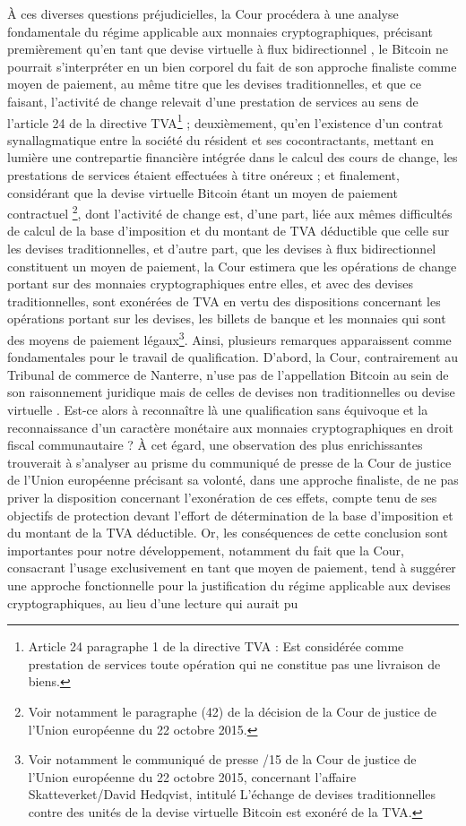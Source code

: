 {À ces diverses questions préjudicielles, la Cour procédera à une analyse fondamentale du régime applicable aux monnaies cryptographiques, précisant premièrement qu'en tant que \og devise virtuelle à flux bidirectionnel \fg{}, le Bitcoin ne pourrait s'interpréter en un bien corporel du fait de son approche finaliste comme moyen de paiement, au même titre que les devises traditionnelles, et que ce faisant, l'activité de change relevait d'une prestation de services au sens de l'article 24 de la directive TVA\footnote{Article 24 paragraphe 1 de la directive TVA : \og Est considérée comme \og prestation de services \fg{} toute opération qui ne constitue pas une livraison de biens\fg{}.} ; deuxièmement, qu'en l'existence d'un contrat synallagmatique entre la société du résident et ses cocontractants, mettant en lumière une contrepartie financière intégrée dans le calcul des cours de change, les prestations de services étaient effectuées à titre onéreux ; et finalement, considérant que \og la devise virtuelle Bitcoin étant un moyen de paiement contractuel \fg\footnote{Voir notamment le paragraphe (42) de la décision de la Cour de justice de l'Union européenne du 22 octobre 2015.}, dont l'activité de change est, d'une part, liée aux mêmes difficultés de calcul de la base d'imposition et du montant de TVA déductible que celle sur les devises traditionnelles, et d'autre part, que les devises à flux bidirectionnel constituent un moyen de paiement, la Cour estimera que les opérations de change portant sur des monnaies cryptographiques entre elles, et avec des devises traditionnelles, sont exonérées de TVA en vertu des dispositions concernant les opérations portant sur \og les devises, les billets de banque et les monnaies qui sont des moyens de paiement légaux\fg\footnote{Voir notamment le communiqué de presse /15 de la Cour de justice de l'Union européenne du 22 octobre 2015, concernant l'affaire Skatteverket/David Hedqvist, intitulé \og L'échange de devises traditionnelles contre des unités de la devise virtuelle Bitcoin est exonéré de la TVA\fg.}. Ainsi, plusieurs remarques apparaissent comme fondamentales pour le travail de qualification. D'abord, la Cour, contrairement au Tribunal de commerce de Nanterre, n'use pas de l'appellation \og Bitcoin \fg{} au sein de son raisonnement juridique mais de celles de \og devises non traditionnelles \fg{} ou \og devise virtuelle \fg{}. Est-ce alors à reconnaître là une qualification sans équivoque et la reconnaissance d'un caractère monétaire aux monnaies cryptographiques en droit fiscal communautaire ? À cet égard, une observation des plus enrichissantes trouverait à s'analyser au prisme du communiqué de presse de la Cour de justice de l'Union européenne précisant sa volonté, dans une approche finaliste, de ne pas priver la disposition concernant l'exonération de ces effets, compte tenu de ses objectifs de protection devant l'effort de détermination de la base d'imposition et du montant de la TVA déductible. Or, les conséquences de cette conclusion sont importantes pour notre développement, notamment du fait que la Cour, consacrant l'usage exclusivement en tant que moyen de paiement, tend à suggérer une approche fonctionnelle pour la justification du régime applicable aux devises cryptographiques, au lieu d'une lecture qui aurait pu }
